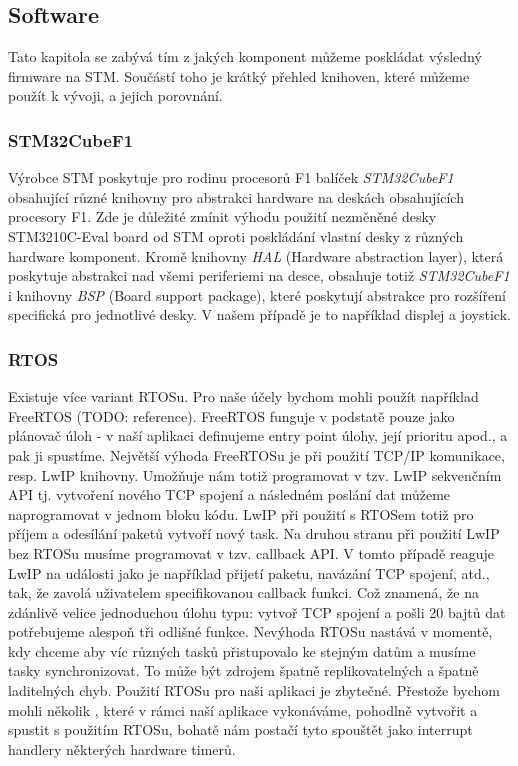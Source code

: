 \subsection{Software}
Tato kapitola se zabývá tím z jakých komponent můžeme poskládat výsledný firmware na STM.
Součástí toho je krátký přehled knihoven, které můžeme použít k vývoji, a jejich porovnání.

\subsubsection{STM32CubeF1}
Výrobce STM poskytuje pro rodinu procesorů F1 balíček \emph{STM32CubeF1} obsahující různé knihovny
pro abstrakci hardware na deskách obsahujících procesory F1.
Zde je důležité zmínit výhodu použití nezměněné desky STM3210C-Eval board od STM oproti poskládání
vlastní desky z různých hardware komponent.
Kromě knihovny \emph{HAL} (Hardware abstraction layer), která poskytuje abstrakci nad všemi
periferiemi na desce, obsahuje totiž \emph{STM32CubeF1} i knihovny \emph{BSP} (Board support package),
které poskytují abstrakce pro rozšíření specifická pro jednotlivé desky.
V našem případě je to například displej a joystick.

\subsubsection{RTOS}
Existuje více variant RTOSu.
Pro naše účely bychom mohli použít například FreeRTOS (TODO: reference).
FreeRTOS funguje v podstatě pouze jako plánovač úloh - v naší aplikaci definujeme entry point
úlohy, její prioritu apod., a pak ji spustíme.
Největší výhoda FreeRTOSu je při použití TCP/IP komunikace, resp. LwIP knihovny.
Umožňuje nám totiž programovat v tzv. LwIP sekvenčním API tj. vytvoření nového TCP spojení
a následném poslání dat můžeme naprogramovat v jednom bloku kódu.
LwIP při použití s RTOSem totiž pro příjem a odesílání paketů vytvoří nový task.
Na druhou stranu při použití LwIP bez RTOSu musíme programovat v tzv. callback API.
V tomto případě reaguje LwIP na události jako je například přijetí paketu, navázání TCP spojení, atd.,
tak, že zavolá uživatelem specifikovanou callback funkci.
Což znamená, že na zdánlivě velice jednoduchou úlohu typu: vytvoř TCP spojení a pošli 20 bajtů dat
potřebujeme alespoň tři odlišné funkce.
Nevýhoda RTOSu nastává v momentě, kdy chceme aby víc různých tasků přistupovalo ke stejným datům
a musíme tasky synchronizovat.
To může být zdrojem špatně replikovatelných a špatně laditelných chyb.
Použití RTOSu pro naši aplikaci je zbytečné.
Přestože bychom mohli několik , které v rámci naší aplikace vykonáváme, pohodlně vytvořit
a spustit s použitím RTOSu, bohatě nám postačí tyto  spouštět jako interrupt handlery některých
hardware timerů.

